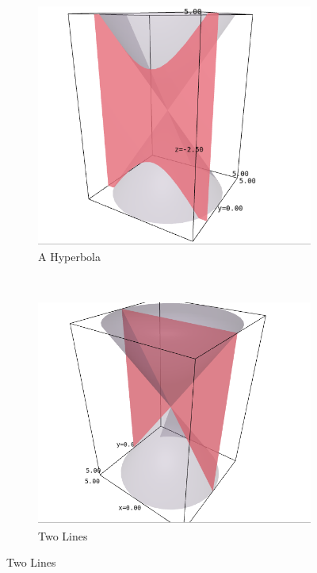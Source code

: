 \documentclass{article}
\theoremstyle{definition}
\begin{document}
\begin{figure}[H]
\begin{subfigure}[b]{0.3\textwidth}
\includegraphics[width=\textwidth]{Selection_053}
\caption{A Hyperbola}
\label{fig:gull2}
\end{subfigure}
~ %
\begin{subfigure}[b]{0.3\textwidth}
\includegraphics[width=\textwidth]{Selection_055}
\caption{Two Lines}
\label{fig:tiger3}
\end{subfigure}

\end{figure}
\end{document}
